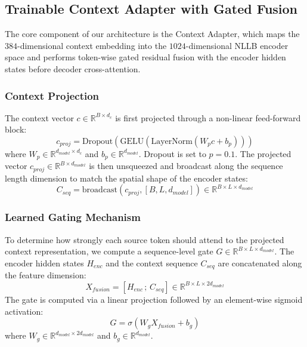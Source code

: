 \documentclass[conference]{IEEEtran}
\begin{document}
\subsection{Trainable Context Adapter with Gated Fusion}
The core component of our architecture is the Context Adapter, which maps the $384$-dimensional context embedding into the $1024$-dimensional NLLB encoder space and performs token-wise gated residual fusion with the encoder hidden states before decoder cross-attention.

\subsubsection{Context Projection}
The context vector $c \in \mathbb{R}^{B \times d_c}$ is first projected through a non-linear feed-forward block:
\begin{equation}
c_{proj} = \text{Dropout}\left(\text{GELU}\left(\text{LayerNorm}(W_{p} c + b_p)\right)\right)
\end{equation}
where $W_p \in \mathbb{R}^{d_{model} \times d_c}$ and $b_p \in \mathbb{R}^{d_{model}}$. Dropout is set to $p=0.1$. The projected vector $c_{proj} \in \mathbb{R}^{B \times d_{model}}$ is then unsqueezed and broadcast along the sequence length dimension to match the spatial shape of the encoder states:
\begin{equation}
C_{seq} = \text{broadcast}(c_{proj}, [B, L, d_{model}]) \in \mathbb{R}^{B \times L \times d_{model}}
\end{equation}

\subsubsection{Learned Gating Mechanism}
To determine how strongly each source token should attend to the projected context representation, we compute a sequence-level gate $G \in \mathbb{R}^{B \times L \times d_{model}}$. The encoder hidden states $H_{enc}$ and the context sequence $C_{seq}$ are concatenated along the feature dimension:
\begin{equation}
X_{fusion} = [H_{enc} \,;\, C_{seq}] \in \mathbb{R}^{B \times L \times 2d_{model}}
\end{equation}
The gate is computed via a linear projection followed by an element-wise sigmoid activation:
\begin{equation}
G = \sigma(W_g X_{fusion} + b_g)
\end{equation}
where $W_g \in \mathbb{R}^{d_{model} \times 2d_{model}}$ and $b_g \in \mathbb{R}^{d_{model}}$.
\end{document}
